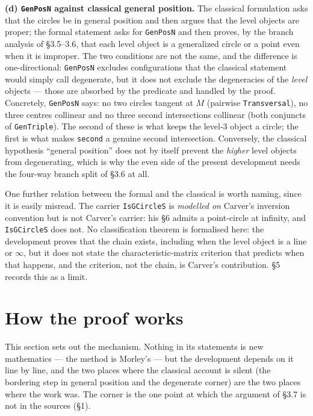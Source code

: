 \documentclass[11pt]{article}
\theoremstyle{definition}
\theoremstyle{remark}
\begin{document}
\textbf{(d) \texttt{GenPosN} against classical general position.} The classical formulation asks that the circles be in
general position and then argues that the level objects are proper; the formal statement asks for
\texttt{GenPosN} and then proves, by the branch analysis of \S{}3.5--3.6, that each level object is a generalized
circle or a point even when it is improper. The two conditions are not the same, and the difference is
one-directional: \texttt{GenPosN} excludes configurations that the classical statement would simply call
degenerate, but it does not exclude the degeneracies of the \emph{level} objects --- those are absorbed by the
predicate and handled by the proof. Concretely, \texttt{GenPosN} says: no two circles tangent at \(M\) (pairwise
\texttt{Transversal}), no three centres collinear and no three second intersections collinear (both conjuncts of
\texttt{GenTriple}). The second of these is what keeps the level-3 object a circle; the first is what makes
\texttt{second} a genuine second intersection. Conversely, the classical hypothesis ``general position'' does not
by itself prevent the \emph{higher} level objects from degenerating, which is why the even side of the present
development needs the four-way branch split of \S{}3.6 at all.

One further relation between the formal and the classical is worth naming, since it is easily misread.
The carrier \texttt{IsGCircleS} is \emph{modelled on} Carver's inversion convention but is not Carver's carrier: his \S{}6
admits a point-circle at infinity, and \texttt{IsGCircleS} does not. No classification theorem is formalised here:
the development proves that the chain exists, including when the level object is a line or $\infty$, but it does
not state the characteristic-matrix criterion that predicts when that happens, and the criterion, not the
chain, is Carver's contribution. \S{}5 records this as a limit.

\hypertarget{how-the-proof-works}{%
\section{How the proof works}\label{how-the-proof-works}}

This section sets out the mechanism. Nothing in its statements is new mathematics --- the method is
Morley's --- but the development depends on it line by line, and the two places where the classical account
is silent (the bordering step in general position and the degenerate corner) are the two places where the
work was. The corner is the one point at which the argument of \S{}3.7 is not in the sources (\S{}1).
\end{document}
